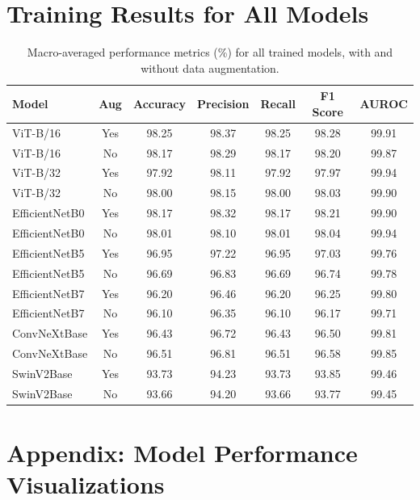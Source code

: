 \documentclass[11pt]{article}
\begin{document}
\section{Training Results for All Models}

\renewcommand{\arraystretch}{1.3}
\begin{table}[H]
\centering
\caption{Macro-averaged performance metrics (\%) for all trained models, with and without data augmentation.}
\label{tab:macro_results}
\begin{tabular}{lcccccc}
\toprule
\textbf{Model} & \textbf{Aug} & \textbf{Accuracy} & \textbf{Precision} & \textbf{Recall} & \textbf{F1 Score} & \textbf{AUROC} \\
\midrule
ViT-B/16       & Yes & 98.25 & 98.37 & 98.25 & 98.28 & 99.91 \\
ViT-B/16       & No  & 98.17 & 98.29 & 98.17 & 98.20 & 99.87 \\
ViT-B/32       & Yes & 97.92 & 98.11 & 97.92 & 97.97 & 99.94 \\
ViT-B/32       & No  & 98.00 & 98.15 & 98.00 & 98.03 & 99.90 \\
EfficientNetB0 & Yes & 98.17 & 98.32 & 98.17 & 98.21 & 99.90 \\
EfficientNetB0 & No  & 98.01 & 98.10 & 98.01 & 98.04 & 99.94 \\
EfficientNetB5 & Yes & 96.95 & 97.22 & 96.95 & 97.03 & 99.76 \\
EfficientNetB5 & No  & 96.69 & 96.83 & 96.69 & 96.74 & 99.78 \\
EfficientNetB7 & Yes & 96.20 & 96.46 & 96.20 & 96.25 & 99.80 \\
EfficientNetB7 & No  & 96.10 & 96.35 & 96.10 & 96.17 & 99.71 \\
ConvNeXtBase   & Yes & 96.43 & 96.72 & 96.43 & 96.50 & 99.81 \\
ConvNeXtBase   & No  & 96.51 & 96.81 & 96.51 & 96.58 & 99.85 \\
SwinV2Base     & Yes & 93.73 & 94.23 & 93.73 & 93.85 & 99.46 \\
SwinV2Base     & No  & 93.66 & 94.20 & 93.66 & 93.77 & 99.45 \\
\bottomrule
\end{tabular}
\end{table}

\section{Appendix: Model Performance Visualizations}
\end{document}
